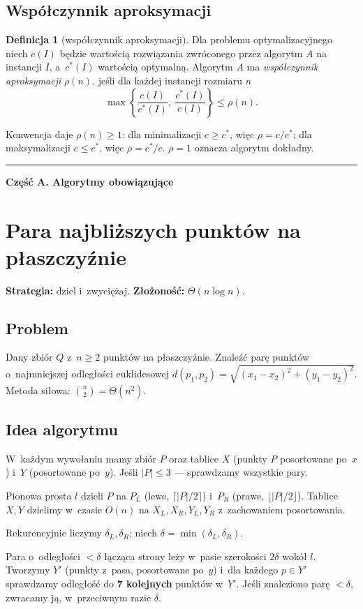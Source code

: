 \documentclass[11pt,a4paper]{article}
\theoremstyle{plain}
\theoremstyle{definition}
\newtheorem{definicja}[twierdzenie]{Definicja}
\begin{document}
\subsection{Współczynnik aproksymacji}\label{sec:approxdef}
\begin{definicja}[współczynnik aproksymacji]\label{def:approx}
Dla problemu optymalizacyjnego niech $c(I)$ będzie wartością rozwiązania zwróconego przez algorytm
$A$ na instancji $I$, a~$c^\ast(I)$ wartością optymalną. Algorytm $A$ ma \emph{współczynnik
aproksymacji} $\rho(n)$, jeśli dla każdej instancji rozmiaru $n$
\[
\max\!\left\{\frac{c(I)}{c^\ast(I)},\ \frac{c^\ast(I)}{c(I)}\right\}\le \rho(n).
\]
\end{definicja}
Konwencja daje $\rho(n)\ge 1$: dla minimalizacji $c\ge c^\ast$, więc $\rho=c/c^\ast$; dla
maksymalizacji $c\le c^\ast$, więc $\rho=c^\ast/c$. $\rho=1$ oznacza algorytm dokładny.

\bigskip
\hrule
\bigskip
\begin{center}\Large\textbf{Część A. Algorytmy obowiązujące}\end{center}

\section{Para najbliższych punktów na płaszczyźnie}\label{sec:closest}
\textbf{Strategia:} dziel i~zwyciężaj. \quad\textbf{Złożoność:} $\Theta(n\log n)$.

\subsection*{Problem}
Dany zbiór $Q$ z~$n\ge 2$ punktów na płaszczyźnie. Znaleźć parę punktów o~najmniejszej odległości
euklidesowej $d(p_1,p_2)=\sqrt{(x_1-x_2)^2+(y_1-y_2)^2}$. Metoda siłowa: $\binom{n}{2}=\Theta(n^2)$.

\subsection*{Idea algorytmu}
W~każdym wywołaniu mamy zbiór $P$ oraz tablice $X$ (punkty $P$ posortowane po~$x$) i~$Y$
(posortowane po~$y$). Jeśli $|P|\le 3$ --- sprawdzamy wszystkie pary.
\begin{description}[leftmargin=2em,style=nextline]
\item[Dziel] Pionowa prosta $l$ dzieli $P$ na $P_L$ (lewe, $\lceil|P|/2\rceil$) i~$P_R$ (prawe,
$\lfloor|P|/2\rfloor$). Tablice $X,Y$ dzielimy w~czasie $O(n)$ na $X_L,X_R,Y_L,Y_R$ z~zachowaniem
posortowania.
\item[Zwyciężaj] Rekurencyjnie liczymy $\delta_L,\delta_R$; niech $\delta=\min(\delta_L,\delta_R)$.
\item[Połącz] Para o~odległości $<\delta$ łącząca strony leży w~pasie szerokości $2\delta$ wokół $l$.
Tworzymy $Y'$ (punkty z~pasa, posortowane po~$y$) i~dla każdego $p\in Y'$ sprawdzamy odległość do
\textbf{7 kolejnych} punktów w~$Y'$. Jeśli znaleziono parę $<\delta$, zwracamy ją, w~przeciwnym razie $\delta$.
\end{description}
\end{document}
